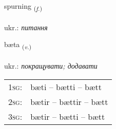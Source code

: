 \documentclass[frontgrid, backgrid]{flacards}\usepackage[]{graphicx}\usepackage[]{xcolor}
\begin{document}
\renewcommand{\flhead}{\vskip5pt \fboxsep=0pt {\small\bfseries\footnotesize Nafnorð | іменник}}
\renewcommand{\fcfoot}{\vskip5pt \fboxsep=0pt \hspace{2pt}{\small\bfseries\footnotesize 1K}}

\renewcommand{\blhead}{\vskip5pt {\small\bfseries\footnotesize Nafnorð | іменник }}
\renewcommand{\bcfoot}{\vskip5pt \hspace{2pt}{\small\bfseries\footnotesize 1K}}


{spurning \small{\textsubscript{(\textit{f.})}} \\[1ex] %
\textphonetic{[spʏrtniŋk]} \\
ukr.: \emph{питання} \\  [2ex]
\renewcommand*{\arraystretch}{0.8}
}

\renewcommand{\flhead}{\vskip5pt \fboxsep=0pt {\small\bfseries\footnotesize Sagnorð | дієслово}}
\renewcommand{\fcfoot}{\vskip5pt \fboxsep=0pt \hspace{2pt}{\small\bfseries\footnotesize 1K}}

\renewcommand{\blhead}{\vskip5pt {\small\bfseries\footnotesize Sagnorð | дієслово }}
\renewcommand{\bcfoot}{\vskip5pt \hspace{2pt}{\small\bfseries\footnotesize 1K}}


{bæta \small{\textsubscript{(\textit{v.})}} \\[1ex] %
\textphonetic{[paiːta]} \\
ukr.: \emph{покращувати; додавати} \\  [2ex]
\renewcommand*{\arraystretch}{0.8}
\begin{tabular}{p{1cm}l}
\textsc{1sg}: & bæti -- bætti -- bætt \\ 
\textsc{2sg}: & bætir -- bættir -- bætt \\ 
\textsc{3sg}: & bætir -- bætti -- bætt \\ 
\end{tabular}
}
\end{document}
